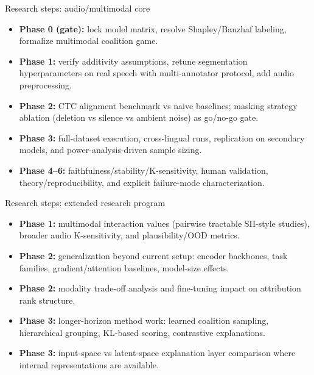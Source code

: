 \documentclass[aspectratio=169]{beamer}
\begin{document}
\begin{frame}{Research steps: audio/multimodal core}
  \begin{itemize}
    \item \textbf{Phase 0 (gate):} lock model matrix, resolve Shapley/Banzhaf labeling, formalize multimodal coalition game.
    \item \textbf{Phase 1:} verify additivity assumptions, retune segmentation hyperparameters on real speech with multi-annotator protocol, add audio preprocessing.
    \item \textbf{Phase 2:} CTC alignment benchmark vs naive baselines; masking strategy ablation (deletion vs silence vs ambient noise) as go/no-go gate.
    \item \textbf{Phase 3:} full-dataset execution, cross-lingual runs, replication on secondary models, and power-analysis-driven sample sizing.
    \item \textbf{Phase 4--6:} faithfulness/stability/K-sensitivity, human validation, theory/reproducibility, and explicit failure-mode characterization.
  \end{itemize}
\end{frame}

\begin{frame}{Research steps: extended research program}
  \begin{itemize}
    \item \textbf{Phase 1:} multimodal interaction values (pairwise tractable SII-style studies), broader audio K-sensitivity, and plausibility/OOD metrics.
    \item \textbf{Phase 2:} generalization beyond current setup: encoder backbones, task families, gradient/attention baselines, model-size effects.
    \item \textbf{Phase 2:} modality trade-off analysis and fine-tuning impact on attribution rank structure.
    \item \textbf{Phase 3:} longer-horizon method work: learned coalition sampling, hierarchical grouping, KL-based scoring, contrastive explanations.
    \item \textbf{Phase 3:} input-space vs latent-space explanation layer comparison where internal representations are available.
  \end{itemize}
\end{frame}
\end{document}
